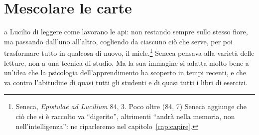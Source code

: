 %
\chapter{Mescolare le carte}
\label{cap:alternanza}


 a Lucilio di leggere come lavorano le
api: non restando sempre sullo stesso fiore, ma passando dall'uno
all'altro, cogliendo da ciascuno ciò che serve, per poi trasformare
tutto in qualcosa di nuovo, il miele.\footnote{Seneca, \emph{Epistulae
ad Lucilium} 84, 3. Poco oltre (84, 7) Seneca aggiunge che ciò che
si è raccolto va \enquote{digerito}, altrimenti \enquote{andrà nella
memoria, non nell'intelligenza}: ne riparleremo nel
capitolo~\ref{cap:capire}.} Seneca pensava alla varietà delle letture,
non a una tecnica di studio. Ma la sua immagine si adatta molto bene a
un'idea che la psicologia dell'apprendimento ha scoperto in tempi
recenti, e che va contro l'abitudine di quasi tutti gli studenti e di
quasi tutti i libri di esercizi.


